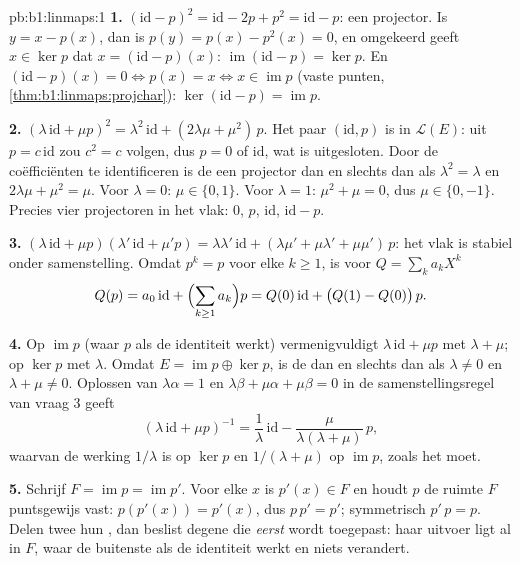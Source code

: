 \begin{solution}{pb:b1:linmaps:1}
\textbf{1.} $(\mathrm{id} - p)^2 = \mathrm{id} - 2p + p^2 =
\mathrm{id} - p$: een projector. Is $y = x - p(x)$, dan is $p(y) =
p(x) - p^2(x) = 0$, en omgekeerd geeft $x \in \ker p$ dat $x =
(\mathrm{id} - p)(x)$: $\operatorname{im}(\mathrm{id} - p) = \ker
p$. En $(\mathrm{id} - p)(x) = 0 \iff p(x) = x \iff x \in
\operatorname{im} p$ (vaste punten,
\cref{thm:b1:linmaps:projchar}): $\ker(\mathrm{id} - p) =
\operatorname{im} p$.

\textbf{2.} $(\lambda\,\mathrm{id} + \mu p)^2 =
\lambda^2\,\mathrm{id} + (2\lambda\mu + \mu^2)\,p$. Het paar
$(\mathrm{id}, p)$ is  in $\mathcal{L}(E)$: uit $p = c\,
\mathrm{id}$ zou $c^2 = c$ volgen, dus $p = 0$ of $\mathrm{id}$,
wat is uitgesloten. Door de coëfficiënten te identificeren is de
 een projector dan en slechts dan als $\lambda^2 =
\lambda$ en $2\lambda\mu + \mu^2 = \mu$. Voor $\lambda = 0$: $\mu
\in \{0, 1\}$. Voor $\lambda = 1$: $\mu^2 + \mu = 0$, dus $\mu \in
\{0, -1\}$. Precies vier projectoren in het vlak: $0$, $p$,
$\mathrm{id}$, $\mathrm{id} - p$.

\textbf{3.} $(\lambda\,\mathrm{id} + \mu p)(\lambda'\,\mathrm{id}
+ \mu' p) = \lambda\lambda'\,\mathrm{id} + (\lambda\mu' +
\mu\lambda' + \mu\mu')\,p$: het vlak is stabiel onder
samenstelling. Omdat $p^k = p$ voor elke $k \geq 1$, is voor $Q =
\sum_k a_k X^k$
\[
Q(p) = a_0\,\mathrm{id} + \Bigl(\sum_{k \geq 1} a_k\Bigr) p
= Q(0)\,\mathrm{id} + \bigl(Q(1) - Q(0)\bigr)\,p .
\]

\textbf{4.} Op $\operatorname{im} p$ (waar $p$ als de identiteit
werkt) vermenigvuldigt $\lambda\,\mathrm{id} + \mu p$ met $\lambda
+ \mu$; op $\ker p$ met $\lambda$. Omdat $E = \operatorname{im} p
\oplus \ker p$, is de   dan en slechts dan als
$\lambda \neq 0$ en $\lambda + \mu \neq 0$. Oplossen van
$\lambda\alpha = 1$ en $\lambda\beta + \mu\alpha + \mu\beta = 0$ in
de samenstellingsregel van vraag 3 geeft
\[
(\lambda\,\mathrm{id} + \mu p)^{-1}
= \frac1\lambda\,\mathrm{id} -
\frac{\mu}{\lambda(\lambda + \mu)}\,p ,
\]
waarvan de werking $1/\lambda$ is op $\ker p$ en $1/(\lambda +
\mu)$ op $\operatorname{im} p$, zoals het moet.

\textbf{5.} Schrijf $F = \operatorname{im} p = \operatorname{im}
p'$. Voor elke $x$ is $p'(x) \in F$ en houdt $p$ de ruimte $F$
puntsgewijs vast: $p(p'(x)) = p'(x)$, dus $p\,p' = p'$;
symmetrisch $p'\,p = p$. Delen twee  hun , dan
beslist degene die \emph{eerst} wordt toegepast: haar uitvoer ligt
al in $F$, waar de buitenste  als de identiteit werkt en
niets verandert.


\end{solution}
